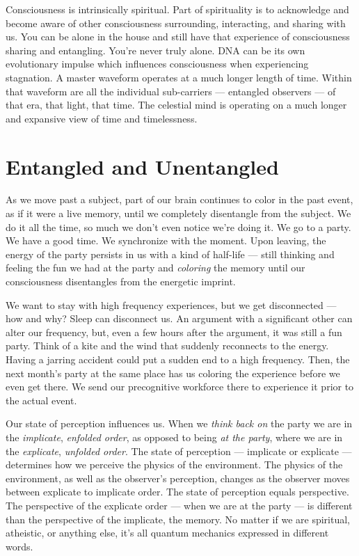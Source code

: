 \documentclass[letterpaper,11pt,twoside,titlepage,onecolumn,openany]{book}
\begin{document}
Consciousness is intrinsically spiritual. Part of spirituality is to
acknowledge and become aware of other consciousness surrounding,
interacting, and sharing with us. You can be alone in the house and
still have that experience of consciousness sharing and entangling.
You're never truly alone. DNA can be its own evolutionary impulse which
influences consciousness when experiencing stagnation. A master waveform
operates at a much longer length of time. Within that waveform are all
the individual sub-carriers --- entangled observers --- of that era,
that light, that time. The celestial mind is operating on a much longer
and expansive view of time and timelessness.

\section*{Entangled and
Unentangled}\label{entangled-and-unentangled}

As we move past a subject, part of our brain continues to color in the
past event, as if it were a live memory, until we completely disentangle
from the subject. We do it all the time, so much we don't even notice
we're doing it. We go to a party. We have a good time. We synchronize
with the moment. Upon leaving, the energy of the party persists in us
with a kind of half-life --- still thinking and feeling the fun we had
at the party and \emph{coloring} the memory until our consciousness
disentangles from the energetic imprint.

We want to stay with high frequency experiences, but we get disconnected
--- how and why? Sleep can disconnect us. An argument with a significant
other can alter our frequency, but, even a few hours after the argument,
it was still a fun party. Think of a kite and the wind that suddenly
reconnects to the energy. Having a jarring accident could put a sudden
end to a high frequency. Then, the next month's party at the same place
has us coloring the experience before we even get there. We send our
precognitive workforce there to experience it prior to the actual event.

Our state of perception influences us. When we \emph{think back on} the
party we are in the \emph{implicate}, \emph{enfolded order}, as opposed
to being \emph{at the party}, where we are in the \emph{explicate},
\emph{unfolded order}. The state of perception --- implicate or
explicate --- determines how we perceive the physics of the environment.
The physics of the environment, as well as the observer's perception,
changes as the observer moves between explicate to implicate order. The
state of perception equals perspective. The perspective of the explicate
order --- when we are at the party --- is different than the perspective
of the implicate, the memory. No matter if we are spiritual, atheistic,
or anything else, it's all quantum mechanics expressed in different
words.
\end{document}
